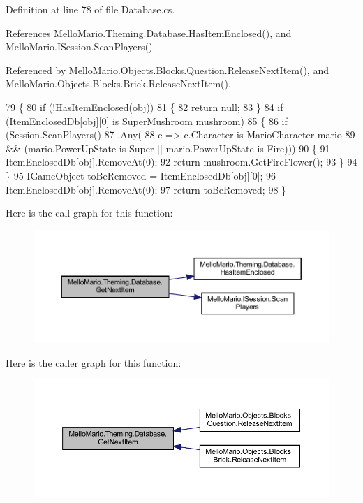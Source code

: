Definition at line 78 of file Database.\+cs.



References Mello\+Mario.\+Theming.\+Database.\+Has\+Item\+Enclosed(), and Mello\+Mario.\+I\+Session.\+Scan\+Players().



Referenced by Mello\+Mario.\+Objects.\+Blocks.\+Question.\+Release\+Next\+Item(), and Mello\+Mario.\+Objects.\+Blocks.\+Brick.\+Release\+Next\+Item().


\begin{DoxyCode}
79         \{
80             \textcolor{keywordflow}{if} (!HasItemEnclosed(obj))
81             \{
82                 \textcolor{keywordflow}{return} null;
83             \}
84             \textcolor{keywordflow}{if} (ItemEnclosedDb[obj][0] is SuperMushroom mushroom)
85             \{
86                 \textcolor{keywordflow}{if} (Session.ScanPlayers()
87                     .Any(
88                         c => c.Character is MarioCharacter mario
89                             && (mario.PowerUpState is Super || mario.PowerUpState is Fire)))
90                 \{
91                     ItemEnclosedDb[obj].RemoveAt(0);
92                     \textcolor{keywordflow}{return} mushroom.GetFireFlower();
93                 \}
94             \}
95             IGameObject toBeRemoved = ItemEnclosedDb[obj][0];
96             ItemEnclosedDb[obj].RemoveAt(0);
97             \textcolor{keywordflow}{return} toBeRemoved;
98         \}
\end{DoxyCode}
Here is the call graph for this function\+:
\nopagebreak
\begin{figure}[H]
\begin{center}
\leavevmode
\includegraphics[width=350pt]{classMelloMario_1_1Theming_1_1Database_a7b74453e6228a9619d340dfc7572a93a_cgraph}
\end{center}
\end{figure}
Here is the caller graph for this function\+:
\nopagebreak
\begin{figure}[H]
\begin{center}
\leavevmode
\includegraphics[width=350pt]{classMelloMario_1_1Theming_1_1Database_a7b74453e6228a9619d340dfc7572a93a_icgraph}
\end{center}
\end{figure}
